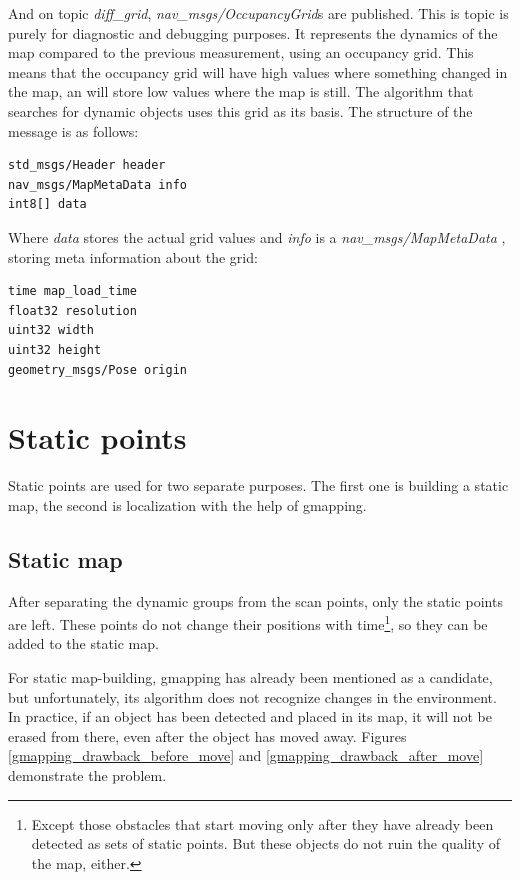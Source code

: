 And on topic \textit{diff\_grid}, \textit{nav\_msgs/OccupancyGrid}s \cite{ros_msg_OccupancyGrid} are published. This is topic is purely for diagnostic and debugging purposes. It represents the dynamics of the map compared to the previous measurement, using an occupancy grid. This means that the occupancy grid will have high values where something changed in the map, an will store low values where the map is still. The algorithm that searches for dynamic objects uses this grid as its basis. The structure of the message is as follows:

\begin{minipage}{\textwidth}
\begin{lstlisting}[language=IDL]
std_msgs/Header header
nav_msgs/MapMetaData info
int8[] data
\end{lstlisting}
\end{minipage}

Where \textit{data} stores the actual grid values and \textit{info} is a \textit{nav\_msgs/MapMetaData} \cite{ros_msg_MapMetaData}, storing meta information about the grid:

\begin{minipage}{\textwidth}
\begin{lstlisting}[language=IDL]
time map_load_time
float32 resolution
uint32 width
uint32 height
geometry_msgs/Pose origin
\end{lstlisting}
\end{minipage}

\section{Static points}
Static points are used for two separate purposes. The first one is building a static map, the second is localization with the help of gmapping.

\subsection{Static map}
\label{chap:static_map}
After separating the dynamic groups from the scan points, only the static points are left. These points do not change their positions with time\footnote{Except those obstacles that start moving only after they have already been detected as sets of static points. But these objects do not ruin the quality of the map, either.}, so they can be added to the static map.

For static map-building, gmapping has already been mentioned as a candidate, but unfortunately, its algorithm does not recognize changes in the environment. In practice, if an object has been detected and placed in its map, it will not be erased from there, even after the object has moved away. Figures \ref{gmapping_drawback_before_move} and \ref{gmapping_drawback_after_move} demonstrate the problem.

